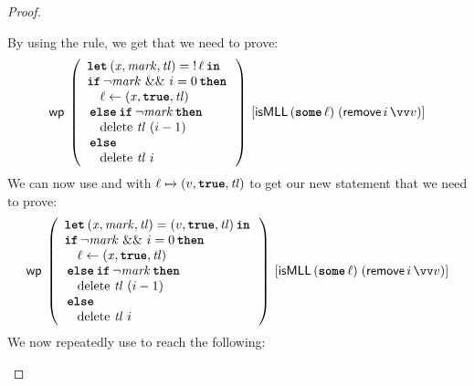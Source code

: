 \documentclass[thesis.tex]{subfiles}
\begin{document}
\begin{proof}
\begin{description}
              By using the  rule, we get that we need to prove:
              \[\wpre{
                      \left(
                      \begin{array}{l}
                              \Let (\lvar, \langv{mark}, \tl) = \deref \loc in \\
                              \If \lnot\langv{mark}\ \&\&\ \iindex = 0 then    \\
                              \quad \loc \gets (\lvar, \True, \tl)             \\
                              \Else \If \lnot\langv{mark} then                 \\
                              \quad \MLLdelete\,\tl\ (\iindex - 1)             \\
                              \Else                                            \\
                              \quad \MLLdelete\,\tl\ \iindex
                          \end{array}
                      \right)
                  }{\isMLL\, (\Some \loc)\; (\textlog{remove}\, \iindex\, \vect{v})}\]
              We can now use  and  with $\loc \fmapsto (\val, \True, \tl)$ to get our new statement that we need to prove:
              \[
                  \wpre{\left(
                      \begin{array}{l}
                              \Let (\lvar, \langv{mark}, \tl) = (\val, \True, \tl) in \\
                              \If \lnot\langv{mark}\ \&\&\ \iindex = 0 then           \\
                              \quad \loc \gets (\lvar, \True, \tl)                    \\
                              \Else \If \lnot\langv{mark} then                        \\
                              \quad \MLLdelete\,\tl\ (\iindex - 1)                    \\
                              \Else                                                   \\
                              \quad \MLLdelete\,\tl\ \iindex
                          \end{array}
                      \right)}{\isMLL\, (\Some \loc)\; (\textlog{remove}\, \iindex\, \vect{v})}
              \]
              We now repeatedly use  to reach the following:
              \[
\]
\end{description}
\end{proof}
\end{document}
